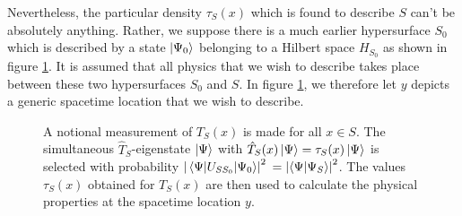 Nevertheless, the particular density $\tau_S(x)$ which is found to describe $S$ can't be absolutely anything. Rather, we suppose there is a much earlier hypersurface $S_0$ which is described by a state $\ket{\Psi_0}$ belonging to a Hilbert space $H_{S_0}$ as shown in figure \ref{S1}.  It is assumed that all physics that we wish to describe takes place between these two hypersurfaces $S_0$ and $S$. In figure \ref{S1}, we therefore let $y$ depicts a generic spacetime location that we wish to describe. 

 \begin{figure}[ht!]
\captionsetup{justification=justified}
\centering



\vspace*{2px}
\caption{A notional measurement of $T_S(x)$ is made for all $x\in S$. The simultaneous  $\hat{T}_S$-eigenstate $\ket{\Psi}$ with $\hat{T}_S(x)\ket{\Psi}=\tau_S(x)\ket{\Psi}$ is selected with probability $\abs{\mel{\Psi}{U_{SS_0}}{\Psi_0}}^2$ $=\abs{\ip{\Psi}{\Psi_S}}^2$. The values $\tau_S(x)$ obtained for $T_S(x)$ are then used to calculate the physical properties at the spacetime location $y$.  }
\label{S1}
\end{figure} 
\vspace*{-12px}



